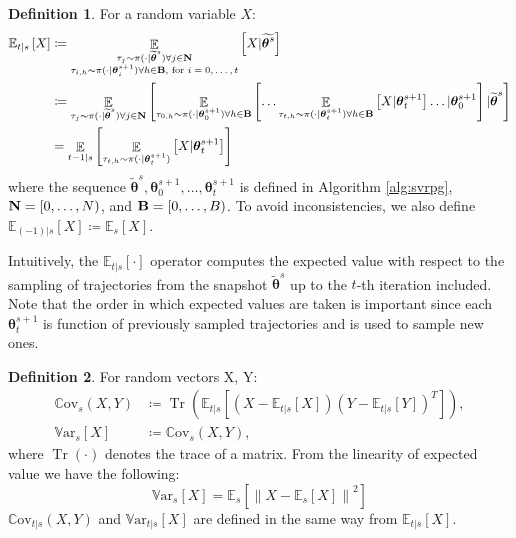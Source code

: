 \documentclass{article}
\theoremstyle{remark}
\theoremstyle{definition}
\newtheorem{definition}{Definition}[section]
\DeclareMathOperator*{\EV}{\mathbb{E}}
\DeclareMathOperator{\Tr}{Tr}
\newcommand{\EVV}[2][\ppvect \in \ppspace]{\EV_{#1}\left[{#2}\right]}
\newcommand{\norm}[2][\infty]{\left\|#2\right\|_{#1}}
\newcommand{\vtheta}{\boldsymbol{\theta}}
\newcommand{\Ets}[2][t]{\mathbb{E}_{#1\vert s}\left[#2\right]}
\newcommand{\Es}[1]{\mathbb{E}_{s}\left[#1\right]}
\newcommand{\Covts}[3][t]{{\mathbb{C}\text{ov}}_{#1\vert s}\left(#2,#3\right)}
\newcommand{\Covs}[2]{{\mathbb{C}\text{ov}}_{s}\left(#1,#2\right)}
\newcommand{\Varts}[2][t]{{\mathbb{V}\text{ar}}_{#1\vert s}\left[#2\right]}
\newcommand{\Vars}[1]{{\mathbb{V}\text{ar}}_{s}\left[#1\right]}
\newcommand{\wt}[1]{\widetilde{#1}}
\begin{document}
\begin{definition}
For a random variable $X$:
\begin{align*}
        \mathbb{E}_{t\vert s}\left[X\right] &\coloneqq 
		\mathop{\mathbb{E}}_{\substack{\tau_j\sim\pi(\cdot\vert\wt{\vtheta}^s)\forall j \in {\it {\bf N}} \\ \tau_{i,h}\sim\pi(\cdot\vert\vtheta^{s+1}_i) \forall h \in {\it {\bf B}}, \text{ for $i=0,\dots,t$}}}{\left[X \vert \wt{\vtheta^s}\right]} \\
	&\coloneqq \EVV[\tau_j\sim\pi(\cdot\vert\wt{\vtheta}^s)\forall j \in {\it {\bf N}}]{
			\EVV[\tau_{0,h}\sim\pi(\cdot\vert\vtheta_0^{s+1}) \forall h \in {\it {\bf B}}]
				{\dots
					\EVV[\tau_{t,h}\sim\pi(\cdot\vert\vtheta_t^{s+1})\forall h \in {\it {\bf B}}]
						{X\vert\vtheta_t^{s+1}}
				 \dots
			\vert\vtheta_0^{s+1}}
		\vert\wt{\vtheta}^s}\\
        &= \EVV[t-1|s]{\EVV[\tau_{t,h}\sim \pi(\cdot|\vtheta^{s+1}_t)]{X|\vtheta^{s+1}_t}}
\end{align*}
where the sequence $\wt{\vtheta}^s,\vtheta_0^{s+1},\dots,\vtheta_t^{s+1}$ is defined in Algorithm \ref{alg:svrpg}, ${\it {\bf N}} = [0,\dots,N)$, and ${\it {\bf B}} = [0,\dots,B)$. To avoid inconsistencies, we also define $\Ets[(-1)]{X} \coloneqq \Es{X}$.

\end{definition}
Intuitively, the $\Ets{\cdot}$ operator computes the expected value with respect to the sampling of trajectories from the snapshot $\wt{\vtheta}^s$ up to the $t$-th iteration included. Note that the order in which expected values are taken is important since each $\vtheta_{t}^{s+1}$ is function of previously sampled trajectories and is used to sample new ones.

\begin{definition}\label{def:var}
For random vectors X, Y:
\begin{align*}
	\Covs{X}{Y} &\coloneqq \Tr\left(\Ets{(X-\Ets{X})(Y-\Ets{Y})^T}\right), \\
	\Vars{X} &\coloneqq \Covs{X}{Y},
\end{align*}
where $\Tr(\cdot)$ denotes the trace of a matrix. From the linearity of expected value we have the following:
\begin{equation}\label{neweq:1}
\Vars{X} = \Es{\norm[]{X-\Es{X}}^2}
\end{equation}
$\Covts[t]{X}{Y}$ and $\Varts[t]{X}$ are defined in the same way from $\Ets[t]{X}$.
\end{definition}
\end{document}
